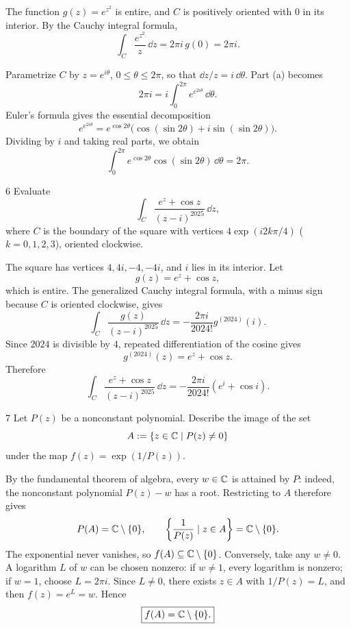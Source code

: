 \documentclass[11pt,oneside]{article}
\begin{document}
\begin{solution}
\begin{problemsubparts}
    \item The function $g(z)=e^{z^2}$ is entire, and $C$ is positively oriented with $0$ in its interior. By the Cauchy integral formula,
    \[
        \boxed{\int_C\frac{e^{z^2}}{z}\,\dd z
        =2\pi i\,g(0)=2\pi i.}
    \]
    \item Parametrize $C$ by $z=e^{i\theta}$, $0\le\theta\le2\pi$, so that $\dd z/z=i\,\dd\theta$. Part (a) becomes
    \[
        2\pi i=i\int_0^{2\pi}e^{e^{2i\theta}}\,\dd\theta.
    \]
    Euler's formula gives the essential decomposition
    \[
        e^{e^{2i\theta}}
        =e^{\cos 2\theta}
          \bigl(\cos(\sin 2\theta)+i\sin(\sin 2\theta)\bigr).
    \]
    Dividing by $i$ and taking real parts, we obtain
    \[
        \boxed{\int_0^{2\pi}e^{\cos 2\theta}
          \cos(\sin 2\theta)\,\dd\theta=2\pi.}
    \]
\end{problemsubparts}
\end{solution}

\begin{problem}{6}
Evaluate
\[
    \int_C\frac{e^z+\cos z}{(z-i)^{2025}}\,\dd z,
\]
where $C$ is the boundary of the square with vertices
$4\exp(i2k\pi/4)$ ($k=0, 1, 2, 3$), oriented clockwise.
\end{problem}

\begin{solution}
The square has vertices $4, 4i, -4, -4i$, and $i$ lies in its interior. Let
\[
    g(z)=e^z+\cos z,
\]
which is entire. The generalized Cauchy integral formula, with a minus sign because $C$ is oriented clockwise, gives
\[
    \int_C\frac{g(z)}{(z-i)^{2025}}\,\dd z
    =-\frac{2\pi i}{2024!}g^{(2024)}(i).
\]
Since $2024$ is divisible by $4$, repeated differentiation of the cosine gives
\[
    g^{(2024)}(z)=e^z+\cos z.
\]
Therefore
\[
    \boxed{\int_C\frac{e^z+\cos z}{(z-i)^{2025}}\,\dd z
    =-\frac{2\pi i}{2024!}(e^i+\cos i).}
\]
\end{solution}

\begin{problem}{7}
Let $P(z)$ be a nonconstant polynomial. Describe the image of the set
\[
    A:=\{z\in\mathbb{C}\mid P(z)\ne0\}
\]
under the map $f(z)=\exp(1/P(z))$.
\end{problem}

\begin{solution}
By the fundamental theorem of algebra, every $w\in\mathbb{C}$ is attained by $P$: indeed, the nonconstant polynomial $P(z)-w$ has a root. Restricting to $A$ therefore gives
\[
    P(A)=\mathbb{C}\setminus\{0\},
    \qquad
    \left\{\frac1{P(z)}\mid z\in A\right\}=\mathbb{C}\setminus\{0\}.
\]
The exponential never vanishes, so $f(A)\subseteq\mathbb{C}\setminus\{0\}$. Conversely, take any $w\ne0$. A logarithm $L$ of $w$ can be chosen nonzero: if $w\ne1$, every logarithm is nonzero; if $w=1$, choose $L=2\pi i$. Since $L\ne0$, there exists $z\in A$ with $1/P(z)=L$, and then $f(z)=e^L=w$. Hence
\[
    \boxed{f(A)=\mathbb{C}\setminus\{0\}.}
\]
\end{solution}
\end{document}
